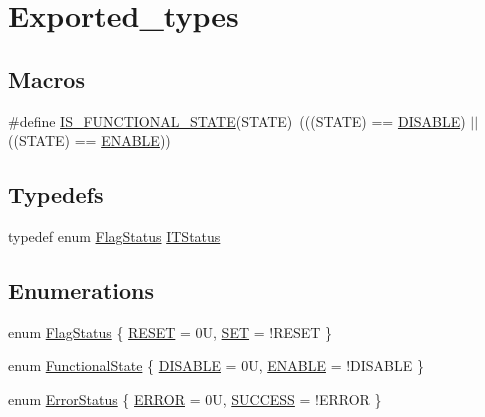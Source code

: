 \hypertarget{group___exported__types}{}\section{Exported\+\_\+types}
\label{group___exported__types}
\subsection*{Macros}
\begin{DoxyCompactItemize}
\item 
\#define \hyperlink{group___exported__types_gaffaf7c3f537d7a3370b1bbdda67a2bf6}{I\+S\+\_\+\+F\+U\+N\+C\+T\+I\+O\+N\+A\+L\+\_\+\+S\+T\+A\+TE}(S\+T\+A\+TE)~(((S\+T\+A\+TE) == \hyperlink{group___exported__types_ggac9a7e9a35d2513ec15c3b537aaa4fba1ad3a9df141be0ccf10389b640f492b26d}{D\+I\+S\+A\+B\+LE}) $\vert$$\vert$ ((S\+T\+A\+TE) == \hyperlink{group___exported__types_ggac9a7e9a35d2513ec15c3b537aaa4fba1a7d46875fa3ebd2c34d2756950eda83bf}{E\+N\+A\+B\+LE}))
\end{DoxyCompactItemize}
\subsection*{Typedefs}
\begin{DoxyCompactItemize}
\item 
typedef enum \hyperlink{group___exported__types_ga89136caac2e14c55151f527ac02daaff}{Flag\+Status} \hyperlink{group___exported__types_gaacbd7ed539db0aacd973a0f6eca34074}{I\+T\+Status}
\end{DoxyCompactItemize}
\subsection*{Enumerations}
\begin{DoxyCompactItemize}
\item 
enum \hyperlink{group___exported__types_ga89136caac2e14c55151f527ac02daaff}{Flag\+Status} \{ \hyperlink{group___exported__types_gga89136caac2e14c55151f527ac02daaffa589b7d94a3d91d145720e2fed0eb3a05}{R\+E\+S\+ET} = 0U, 
\hyperlink{group___exported__types_gga89136caac2e14c55151f527ac02daaffab44c8101cc294c074709ec1b14211792}{S\+ET} = !\+R\+E\+S\+ET
 \}
\item 
enum \hyperlink{group___exported__types_gac9a7e9a35d2513ec15c3b537aaa4fba1}{Functional\+State} \{ \hyperlink{group___exported__types_ggac9a7e9a35d2513ec15c3b537aaa4fba1ad3a9df141be0ccf10389b640f492b26d}{D\+I\+S\+A\+B\+LE} = 0U, 
\hyperlink{group___exported__types_ggac9a7e9a35d2513ec15c3b537aaa4fba1a7d46875fa3ebd2c34d2756950eda83bf}{E\+N\+A\+B\+LE} = !\+D\+I\+S\+A\+B\+LE
 \}
\item 
enum \hyperlink{group___exported__types_ga8333b96c67f83cba354b3407fcbb6ee8}{Error\+Status} \{ \hyperlink{group___exported__types_gga8333b96c67f83cba354b3407fcbb6ee8a2fd6f336d08340583bd620a7f5694c90}{E\+R\+R\+OR} = 0U, 
\hyperlink{group___exported__types_gga8333b96c67f83cba354b3407fcbb6ee8ac7f69f7c9e5aea9b8f54cf02870e2bf8}{S\+U\+C\+C\+E\+SS} = !\+E\+R\+R\+OR
 \}
\end{DoxyCompactItemize}


